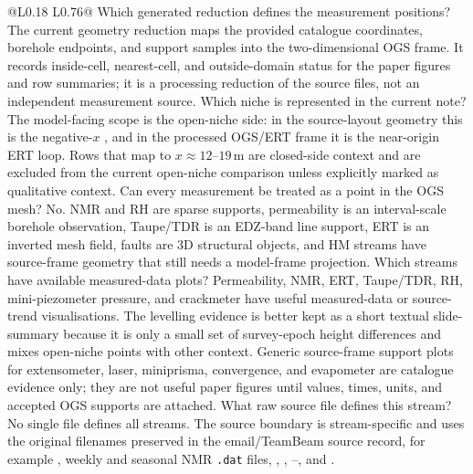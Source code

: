 \begin{longtable}{@{}L{0.18\textwidth} L{0.76\textwidth}@{}}
\toprule
{}
{ Which generated reduction defines the measurement positions?}
{The current geometry reduction maps the provided catalogue coordinates, borehole
endpoints, and support samples into the two-dimensional OGS frame.  It records
inside-cell, nearest-cell, and outside-domain status for the paper figures and
row summaries; it is a processing reduction of the source files, not an independent
measurement source.}
{ Which niche is represented in the current note?}
{The model-facing scope is the open-niche side: in the source-layout geometry this
is the negative-\(x\) , and in the processed OGS/ERT frame it is the
near-origin ERT loop.  Rows that map to \(x\approx 12\)--\(19\,\mathrm{m}\) are
closed-side context and are excluded from the current open-niche comparison unless
explicitly marked as qualitative context.}
{ Can every measurement be treated as a point in the OGS mesh?}
{No.  NMR and RH are sparse supports, permeability is an interval-scale borehole
observation, Taupe/TDR is an EDZ-band line support, ERT is an inverted mesh field,
faults are 3D structural objects, and HM streams have source-frame geometry that
still needs a model-frame projection.}
{ Which streams have available measured-data plots?}
{Permeability, NMR, ERT, Taupe/TDR, RH, mini-piezometer pressure, and crackmeter
have useful measured-data or source-trend visualisations.  The levelling evidence is
better kept as a short textual slide-summary because it is only a small set of
survey-epoch height differences and mixes open-niche points with other context.
Generic source-frame support plots for extensometer, laser, miniprisma,
convergence, and evapometer are catalogue evidence only; they are not useful paper
figures until values, times, units, and accepted OGS supports are attached.}
{ What raw source file defines this stream?}
{No single file defines all streams.  The source boundary is stream-specific and
uses the original filenames preserved in the email/TeamBeam source record, for
example , weekly and seasonal NMR
\texttt{.dat} files, , ,
--, and .}

\end{longtable}
